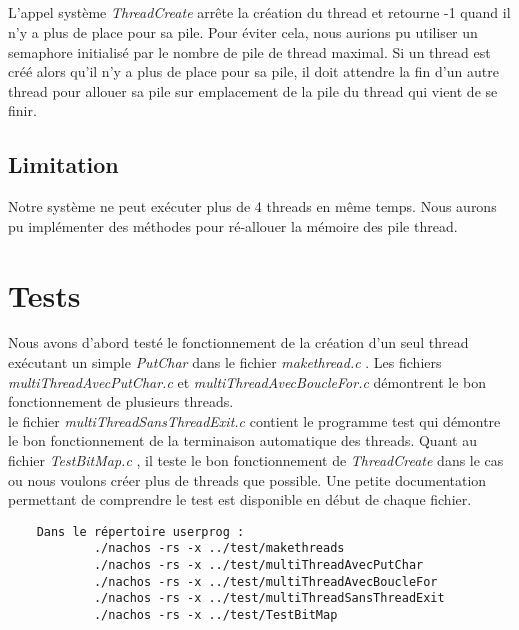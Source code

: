 \documentclass[12pt, a4paper]{report}
\begin{document}
	\paragraph{}
	L'appel système \textit{ ThreadCreate } arrête la création du thread et retourne -1 quand il n'y a plus de place pour sa pile. Pour éviter cela, nous aurions pu utiliser un semaphore initialisé par le nombre de pile de thread maximal. Si un thread est créé alors qu'il n'y a plus de place pour sa pile, il doit attendre la fin d'un autre thread pour allouer sa pile sur emplacement de la pile du thread qui vient de se finir. 
		\section{Limitation}
 Notre système ne peut exécuter plus de 4 threads en même temps. Nous aurons pu implémenter des méthodes pour ré-allouer la mémoire des pile thread. 
	
	
\chapter{Tests}
	Nous avons d'abord testé le fonctionnement de la création d'un seul thread exécutant un simple \textit{ PutChar } dans le fichier \textit{ makethread.c }. Les fichiers \textit{ multiThreadAvecPutChar.c } et \textit{ multiThreadAvecBoucleFor.c } démontrent le bon fonctionnement de plusieurs threads.\\
	le fichier \textit{ multiThreadSansThreadExit.c }  contient le programme test qui démontre le bon fonctionnement de la terminaison automatique des threads. Quant au fichier \textit{ TestBitMap.c } , il teste le bon fonctionnement de \textit{ ThreadCreate } dans le cas ou nous voulons créer plus de threads que possible.
	Une petite documentation permettant de comprendre le test est disponible en début de chaque fichier.\\
	\begin{verbatim}
	Dans le répertoire userprog :
   	        ./nachos -rs -x ../test/makethreads
   	        ./nachos -rs -x ../test/multiThreadAvecPutChar
   	        ./nachos -rs -x ../test/multiThreadAvecBoucleFor
   	        ./nachos -rs -x ../test/multiThreadSansThreadExit
   	        ./nachos -rs -x ../test/TestBitMap
   		
	\end{verbatim}
\end{document}
